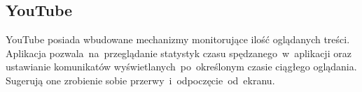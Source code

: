 \bigskip
{}

\subsection{YouTube}
\label{sec:youtube}
YouTube posiada wbudowane mechanizmy monitorujące ilość oglądanych treści. Aplikacja pozwala~na~przeglądanie statystyk czasu spędzanego~w~aplikacji oraz ustawianie komunikatów wyświetlanych~po~określonym czasie ciągłego oglądania. Sugerują one zrobienie sobie przerwy~i~odpoczęcie~od~ekranu.

\bigskip
{}
